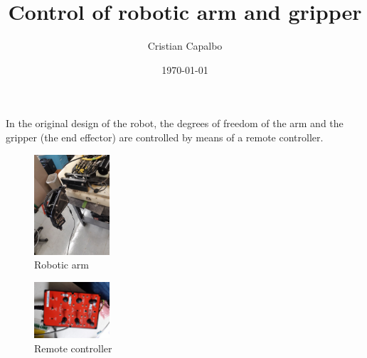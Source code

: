 \documentclass[12pt, letterpaper]{article}
\title{Control of robotic arm and gripper}
\author{Cristian Capalbo}
\date{\today}
\begin{document}
\maketitle

In the original design of the robot, the degrees of freedom of the arm and the gripper (the end effector) are controlled by means of a remote controller. 

\begin{figure}[h]
    \centering
    \includegraphics[width=0.25\textwidth]{arm}
    \caption{Robotic arm}
    \label{fig:arm}
\end{figure}

\begin{figure}[h]
    \centering
    \includegraphics[width=0.25\textwidth]{remote.jpg}
    \caption{Remote controller}
    \label{fig:remote}
\end{figure}
\end{document}
